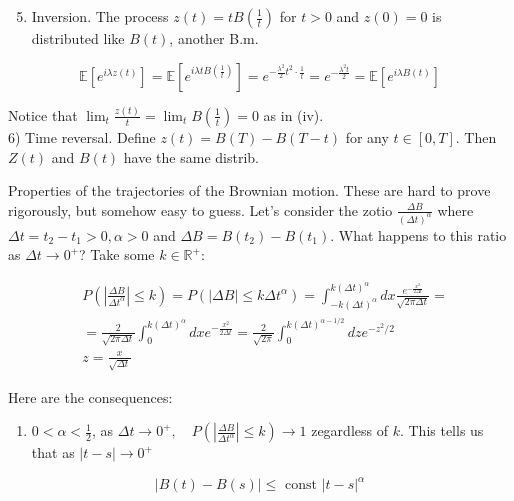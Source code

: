 \documentclass[10pt]{article}
\begin{document}
\begin{enumerate}
  \setcounter{enumi}{4}
  \item Inversion. The process $z(t)=t B\left(\frac{1}{t}\right)$ for $t>0$ and $z(0)=0$ is distributed like $B(t)$, another B.m.
\end{enumerate}

$$
\mathbb{E}\left[e^{i \lambda z(t)}\right]=\mathbb{E}\left[e^{i \lambda t B\left(\frac{1}{t}\right)}\right]=e^{-\frac{\lambda^{2}}{2} t^{2} \cdot \frac{1}{t}}=e^{-\frac{\lambda^{2} t}{2}}=\mathbb{E}\left[e^{i \lambda B(t)}\right]
$$

Notice that $\lim _{t} \frac{z(t)}{t}=\lim _{t} B\left(\frac{1}{t}\right)=0$ as in (iv).\\
6) Time reversal. Define $z(t)=B(T)-B(T-t)$ for any $t \in[0, T]$. Then $Z(t)$ and $B(t)$ have the same distrib.

Properties of the trajectories of the Brownian motion. These are hard to prove rigorously, but somehow easy to guess. Let's consider the zotio $\frac{\Delta B}{(\Delta t)^{\alpha}}$ where $\Delta t=t_{2}-t_{1}>0, \alpha>0$ and $\Delta B=B\left(t_{2}\right)-B\left(t_{1}\right)$. What happens to this ratio as $\Delta t \rightarrow 0^{+}$? Take some $k \in \mathbb{R}^{+}$:


\begin{align*}
& P\left(\left|\frac{\Delta B}{\Delta t^{\alpha}}\right| \leqslant k\right)=P\left(|\Delta B| \leqslant k \Delta t^{\alpha}\right)=\int_{-k(\Delta t)^{\alpha}}^{k(\Delta t)^{\alpha}} d x \frac{e^{-\frac{x^{2}}{2 \Delta t}}}{\sqrt{2 \pi \Delta t}}= \\
& =\frac{2}{\sqrt{2 \pi \Delta t}} \int_{0}^{k(\Delta t)^{\alpha}} d x e^{-\frac{x^{2}}{2 \Delta t}}=\frac{2}{\sqrt{2 \pi}} \int_{0}^{k(\Delta t)^{\alpha-1 / 2}} d z e^{-z^{2} / 2}  \tag{3}\\
& z=\frac{x}{\sqrt{\Delta t}}
\end{align*}


Here are the consequences:

\begin{enumerate}
  \item $0<\alpha<\frac{1}{2}$, as $\Delta t \rightarrow 0^{+}, \quad P\left(\left|\frac{\Delta B}{\Delta t^{\alpha}}\right| \leqslant k\right) \rightarrow 1$ zegardless of $k$. This tells us that as $|t-s| \rightarrow 0^{+}$
\end{enumerate}

$$
|B(t)-B(s)| \leqslant \text { const }|t-s|^{\alpha}
$$
\end{document}
